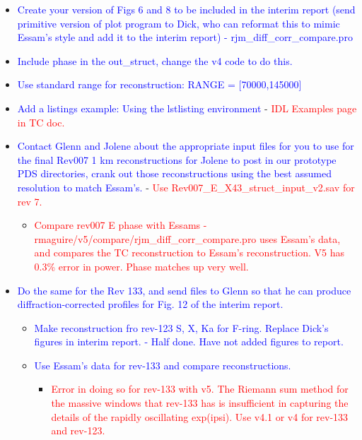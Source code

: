 \documentclass[crop=false,class=book]{standalone}
\begin{document}
\begin{itemize}
    \item \textcolor{blue}{Create your version of Figs 6 and 8 to be included in the interim report (send primitive version of plot program to Dick, who can reformat this to mimic Essam’s style and add it to the interim report) - rjm\_diff\_corr\_compare.pro}
    \item \textcolor{blue}{Include phase in the out\_struct, change the v4 code to do this.}
    \item \textcolor{blue}{Use standard range for reconstruction: RANGE = [70000,145000]}
    \item \textcolor{blue}{Add a listings example: Using the lstlisting environment} - \textcolor{red}{IDL Examples page in TC doc.}
    \item \textcolor{blue}{Contact Glenn and Jolene about the appropriate input files for you to use for the final Rev007 1 km reconstructions for Jolene to post in our prototype PDS directories, crank out those reconstructions using the best assumed resolution to match Essam's.} - \textcolor{red}{Use Rev007\_E\_X43\_struct\_input\_v2.sav for rev 7.}
    \begin{itemize}
        \item \textcolor{red}{Compare rev007 E phase with Essams - rmaguire/v5/compare/rjm\_diff\_corr\_compare.pro uses Essam’s data, and compares the TC reconstruction to Essam’s reconstruction. V5 has 0.3\% error in power. Phase matches up very well.}
    \end{itemize}
    \item \textcolor{blue}{Do the same for the Rev 133, and send files to Glenn so that he can produce diffraction-corrected profiles for Fig. 12 of the interim report.}
    \begin{itemize}
        \item \textcolor{blue}{Make reconstruction fro rev-123 S, X, Ka for F-ring. Replace Dick’s figures in interim report. - Half done. Have not added figures to report.}
        \item \textcolor{blue}{Use Essam’s data for rev-133 and compare reconstructions.}
        \begin{itemize}
            \item \textcolor{red}{Error in doing so for rev-133 with v5. The Riemann sum method for the massive windows that rev-133 has is insufficient in capturing the details of the rapidly oscillating exp(ipsi). Use v4.1 or v4 for rev-133 and rev-123.}
        \end{itemize}

\end{itemize}
\end{itemize}
\end{document}
